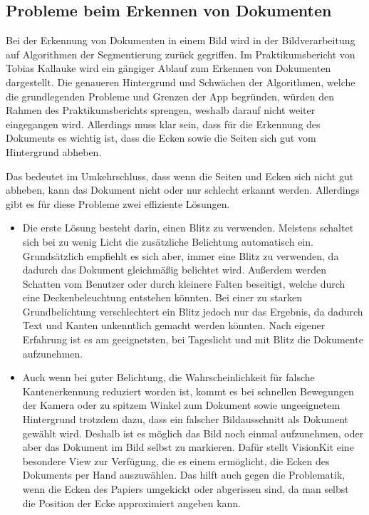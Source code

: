 \documentclass[notables, nomenclature, oneside, 150]{HSMW-Thesis}
\begin{document}
		\subsection{Probleme beim Erkennen von Dokumenten}\label{ssc:erkennen}
			Bei der Erkennung von Dokumenten in einem Bild wird in der Bildverarbeitung auf Algorithmen der Segmentierung zurück gegriffen. Im Praktikumsbericht von Tobias Kallauke wird ein gängiger Ablauf zum Erkennen von Dokumenten dargestellt. Die genaueren Hintergrund und Schwächen der Algorithmen, welche die grundlegenden Probleme und Grenzen der App begründen, würden den Rahmen des Praktikumsberichts sprengen, weshalb darauf nicht weiter eingegangen wird. Allerdings muss klar sein, dass für die Erkennung des Dokuments es wichtig ist, dass die Ecken sowie die Seiten sich gut vom Hintergrund abheben.
		
			Das bedeutet im Umkehrschluss, dass wenn die Seiten und Ecken sich nicht gut abheben, kann das Dokument nicht oder nur schlecht erkannt werden. Allerdings gibt es für diese Probleme zwei effiziente Lösungen. 
			\begin{itemize}
				\item Die erste Lösung besteht darin, einen Blitz zu verwenden. Meistens schaltet sich bei zu wenig Licht die zusätzliche Belichtung automatisch ein. Grundsätzlich empfiehlt es sich aber, immer eine Blitz zu verwenden, da dadurch das Dokument gleichmäßig belichtet wird. Außerdem werden Schatten vom Benutzer oder durch kleinere Falten beseitigt, welche durch eine Deckenbeleuchtung entstehen könnten. Bei einer zu starken Grundbelichtung verschlechtert ein Blitz jedoch nur das Ergebnis, da dadurch Text und Kanten unkenntlich gemacht werden könnten. Nach eigener Erfahrung ist es am geeignetsten, bei Tageslicht und mit Blitz die Dokumente aufzunehmen. 
				\item Auch wenn bei guter Belichtung, die Wahrscheinlichkeit für falsche Kantenerkennung reduziert worden ist, kommt es bei schnellen Bewegungen der Kamera oder zu spitzem Winkel zum Dokument sowie ungeeignetem Hintergrund trotzdem dazu, dass ein falscher Bildausschnitt als Dokument gewählt wird. Deshalb ist es möglich das Bild noch einmal aufzunehmen, oder aber das Dokument im Bild selbst zu markieren. Dafür stellt VisionKit eine besondere View zur Verfügung, die es einem ermöglicht, die Ecken des Dokuments per Hand auszuwählen. Das hilft auch gegen die Problematik, wenn die Ecken des Papiers umgekickt oder abgerissen sind, da man selbst die Position der Ecke approximiert angeben kann. 
			\end{itemize}
		
\end{document}
